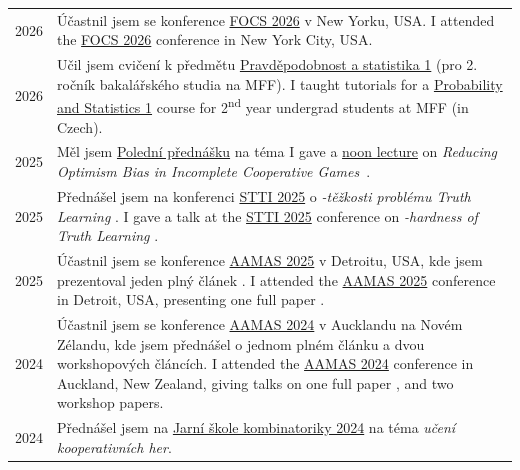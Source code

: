 \begin{tabularx}{\linewidth}{>{\raggedleft\scshape}p{2cm}X}
	2026          & \lng
	{Účastnil jsem se konference \href{https://focs.computer.org/2026}{FOCS 2026} v New Yorku, USA.}
	{I attended the \href{https://focs.computer.org/2026}{FOCS 2026} conference in New York City, USA.}
	\\
	2026          & \lng
	{Učil jsem cvičení k předmětu \href{https://furadnik.github.io/teaching/2526l-past}{Pravděpodobnost a statistika 1} (pro 2. ročník bakalářského studia na MFF).}
	{I taught tutorials for a \href{https://furadnik.github.io/teaching/2526l-past}{Probability and Statistics 1} course for 2\textsuperscript{nd} year undergrad students at MFF (in Czech).}
	\\
	2025          & \lng
	{Měl jsem \href{https://www.mff.cuni.cz/en/kam/teaching-and-seminars/noon-lectures/2025/30102025}{Polední přednášku} na téma}
	{I gave a \href{https://www.mff.cuni.cz/en/kam/teaching-and-seminars/noon-lectures/2025/30102025}{noon lecture} on}
	 \emph{Reducing Optimism Bias in Incomplete Cooperative Games}~\cite{10.5555/3635637.3663047}.
	\\
	2025          & \lng
	{Přednášel jsem na konferenci \href{https://www.mff.cuni.cz/cs/iuuk/akce/konference/stti-2025}{STTI 2025} o \emph{\np-těžkosti problému Truth Learning} \cite{aamas25}.}
	{I gave a talk at the \href{https://www.mff.cuni.cz/cs/iuuk/akce/konference/stti-2025}{STTI 2025} conference on \emph{\np-hardness of Truth Learning} \cite{aamas25}.}
	\\
	2025          & \lng
	{Účastnil jsem se konference \href{https://aamas2025.org/}{AAMAS 2025} v Detroitu, USA, kde jsem prezentoval jeden plný článek \cite{aamas25}.}
	{I attended the \href{https://aamas2025.org/}{AAMAS 2025} conference in Detroit, USA, presenting one full paper \cite{aamas25}.}
	\\
	2024          & \lng
	{Účastnil jsem se konference \href{https://www.aamas2024-conference.auckland.ac.nz/}{AAMAS 2024} v Aucklandu na Novém Zélandu, kde jsem přednášel o jednom plném článku \cite{10.5555/3635637.3663047} a dvou workshopových článcích.}
	{I attended the \href{https://www.aamas2024-conference.auckland.ac.nz/}{AAMAS 2024} conference in Auckland, New Zealand, giving talks on one full paper \cite{10.5555/3635637.3663047}, and two workshop papers.}
	\\
	2024          & \lng
	{Přednášel jsem na \href{https://kam.mff.cuni.cz/~spring/2024/}{Jarní škole kombinatoriky 2024} na téma \emph{učení kooperativních her}.}

\end{tabularx}
